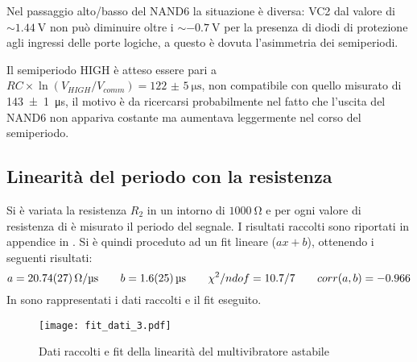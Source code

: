 Nel passaggio alto/basso del NAND6 la situazione è diversa: VC2 dal valore di $\sim \SI{1.44}{\volt}$ non può diminuire oltre i $\sim\SI{-0.7}{\volt}$ per la presenza di diodi di protezione agli ingressi delle porte logiche, a questo è dovuta l'asimmetria dei semiperiodi.

Il semiperiodo HIGH è atteso essere pari a $RC\times \ln(V_{HIGH}/V_{comm}) = \SI{122(5)}{\micro\second}$, non compatibile con quello misurato di \SI{143(1)}{\micro\second}, il motivo è da ricercarsi probabilmente nel fatto che l'uscita del NAND6 non appariva costante ma aumentava leggermente nel corso del semiperiodo.
	
\subsection{Linearità del periodo con la resistenza}
Si è variata la resistenza $R_2$ in un intorno di $\SI{1000}{\ohm}$ e per ogni valore di resistenza di è misurato il periodo del segnale. I risultati raccolti sono riportati in appendice in .
Si è quindi proceduto ad un fit lineare ($ax+b$), ottenendo i seguenti risultati:
$$a = \SI{20.74(27)}{\ohm / \micro\second} \qquad b=\SI{1.6 \pm 2.5}{\micro \second} \qquad \chi^2/ndof = 10.7/7 \qquad corr(a,b)= -0.966$$
In  sono rappresentati i dati raccolti e il fit eseguito.

\begin{figure}[h!]
	\centering
	\texttt{[image: fit\_dati\_3.pdf]}
	\caption{Dati raccolti e fit della linearità del multivibratore astabile}
	\label{astab_lin}
\end{figure}



